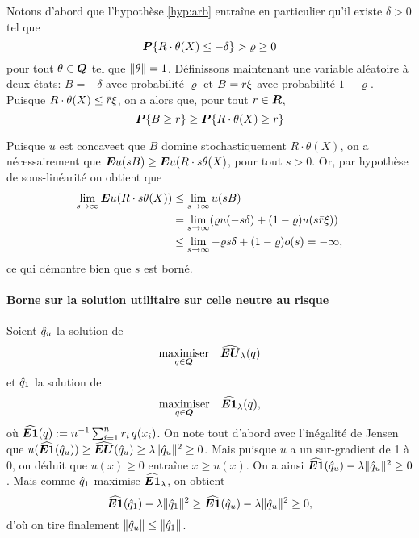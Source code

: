 Notons d'abord que l'hypothèse \ref{hyp:arb} entraîne en particulier qu'il existe $\delta > 0$
tel que
\begin{equation}
  \pp\{R\cdot \theta(X) \leq -\delta\} > \varrho \geq 0
\end{equation}
pour tout $\theta \in \Q$ tel que $\nq{\theta} = 1$. Définissons maintenant une variable aléatoire à
deux états: $B = -\delta$ avec probabilité $\varrho$ et $B = \rmax\xi$ avec probabilité $1-\varrho$. Puisque
$R\cdot \theta(X) \leq \rmax\xi$, on a alors que, pour tout $r \in \R$,
\begin{equation}
  \pp\{B\geq r\} \geq \pp\{R\cdot \theta(X)\geq r\}
\end{equation}

Puisque $u$ est concave\cit et que $B$ domine stochastiquement $R\cdot \theta(X)$, on a
nécessairement que $\E u(sB) \geq \E u(R\cdot s\theta(X)$, pour tout $s > 0$. Or, par hypothèse de
sous-linéarité on obtient que
\begin{align}
  \lim_{s\to\infty}\E u(R\cdot s\theta(X)) &\leq \lim_{s\to\infty}u(sB)\\
                           & = \lim_{s\to\infty}(\varrho u(-s\delta) + (1-\varrho)u(s\rmax\xi))\\
                           & \leq\lim_{s\to\infty}-\varrho s \delta + (1-\varrho)o(s) = -\infty,
\end{align}
ce qui démontre bien que $s$ est borné.


\paragraph{Borne sur la solution utilitaire sur celle neutre au risque}

Soient $\qu$ la solution de 
\begin{equation}
  \maximizeEquation[q \in \Q]{\hEU_\lambda(q)}
\end{equation}
et $\qn$ la solution de
\begin{equation}
  \maximizeEquation[q \in \Q]{\hEN_\lambda(q),}
\end{equation}
où $\hEN(q):=n^{-1}\sumi r_i\,q(x_i)$. On note tout d'abord avec l'inégalité de Jensen que
$u(\hEN(\qu)) \geq \hEU(\qu) \geq \lambda\nq{\qu}^2 \geq 0$. Mais puisque $u$ a un sur-gradient de 1 à
$0$, on déduit que $u(x) \geq 0$ entraîne $x \geq u(x)$. On a ainsi
$\hEN(\qu) - \lambda\nq{\qu}^2 \geq 0$. Mais comme $\qn$ maximise $\hEN_\lambda$, on obtient
\begin{equation}
  \hEN(\qn) - \lambda\nq{\qn}^2 \geq \hEN(\qu) - \lambda\nq{\qu}^2 \geq 0,
\end{equation}
d'où on tire finalement $\nq{\qu} \leq \nq{\qn}$. 



